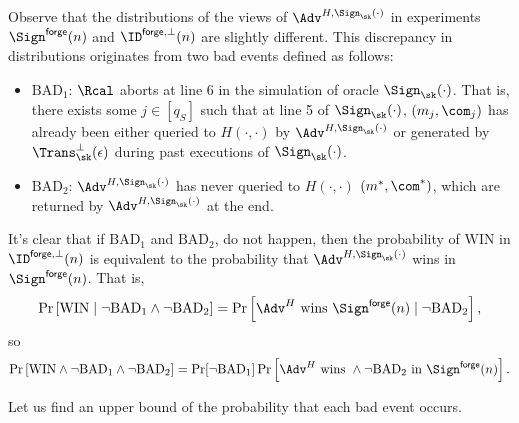 \begin{answer}
    Observe that the distributions of the views of $\Adv^{H,\Sign_\sk(\cdot)}$ in experiments $\Sign^{\mathsf{forge}}(n)$ and $\ID^{\mathsf{forge},\bot}(n)$ are slightly different. This discrepancy in distributions originates from two bad events defined as follows:
    \begin{itemize}
        \item $\textrm{BAD}_1$: $\Rcal$ aborts at line 6 in the simulation of oracle $\Sign_\sk(\cdot)$. That is, there exists some $j\in [q_S]$ such that at line 5 of $\Sign_\sk(\cdot)$, $(m_j, \com_j)$ has already been either queried to $H(\cdot, \cdot)$ by $\Adv^{H,\Sign_\sk(\cdot)}$ or generated by $\Trans_\sk^\bot(\epsilon)$ during past executions of $\Sign_\sk(\cdot)$.
        \item $\textrm{BAD}_2$: $\Adv^{H,\Sign_\sk(\cdot)}$ has never queried to $H(\cdot, \cdot)$ $(m^\ast, \com^\ast)$, which are returned by $\Adv^{H,\Sign_\sk(\cdot)}$ at the end.
    \end{itemize}
    It's clear that if $\textrm{BAD}_1$ and $\textrm{BAD}_2$, do not happen, then the probability of $\textrm{WIN}$ in $\ID^{\mathsf{forge},\bot}(n)$  is equivalent to the probability that $\Adv^{H,\Sign_\sk(\cdot)}$ wins in $\Sign^{\mathsf{forge}}(n)$. That is,
    \[
        \Pr\left[\textrm{WIN}\mid \neg \textrm{BAD}_1\land \neg \textrm{BAD}_2 \right]
        = \Pr\left[\Adv^H \textrm{ wins }\Sign^{\mathsf{forge}}(n)\mid \neg \textrm{BAD}_2   \right],
    \]
    so
    \begin{equation}\label{eq:p2-8}
        \Pr\left[\textrm{WIN} \land \neg \textrm{BAD}_1 \land \neg \textrm{BAD}_2 \right]
        = \Pr[\neg \textrm{BAD}_1]\Pr\left[\Adv^H \textrm{ wins } \land \neg \textrm{BAD}_2 \textrm{ in } \Sign^{\mathsf{forge}}(n)  \right].
    \end{equation}
    
    Let us find an upper bound of the probability that each bad event occurs.


\end{answer}
